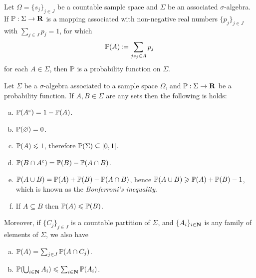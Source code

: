 \begin{lemma}
\label{lem:probability-function}
Let \(\Omega = \{s_j\}_{j \in J}\) be a countable sample space and \(\Sigma\) be
an associated \(\sigma\)-algebra. If \(\operatorname{\mathbb{P}}: \Sigma \to \mathbf{R}\) is a mapping
associated with non-negative real numbers \(\{p_j\}_{j \in J}\) with
\(\sum_{j \in J} p_j = 1\), for which
\[
\operatorname{\mathbb{P}}(A) \coloneq \sum_{j \relax s_j \in A} p_j
\]
for each \(A \in \Sigma\), then \(\operatorname{\mathbb{P}}\) is a probability function on \(\Sigma\).
\end{lemma}

\begin{theorem}
\label{thm:probability-calculus-basics}
Let \(\Sigma\) be a \(\sigma\)-algebra associated to a sample space \(\Omega\),
and \(\operatorname{\mathbb{P}}: \Sigma \to \mathbf{R}\) be a probability function. If \(A, B \in \Sigma\) are
any sets then the following is holds:
\begin{enumerate}[(a)]\setlength\itemsep{0em}
\item \(\operatorname{\mathbb{P}}({A}^{\text{c}}) = 1 - \operatorname{\mathbb{P}}(A)\).
\item \(\operatorname{\mathbb{P}}(\varnothing) = 0\).
\item \(\operatorname{\mathbb{P}}(A) \leqslant 1\), therefore \(\operatorname{\mathbb{P}}(\Sigma) \subseteq [0, 1]\).
\item \(\operatorname{\mathbb{P}}(B \cap {A}^{\text{c}}) = \operatorname{\mathbb{P}}(B) - \operatorname{\mathbb{P}}(A \cap B)\).
\item \(\operatorname{\mathbb{P}}(A \cup B) = \operatorname{\mathbb{P}}(A) + \operatorname{\mathbb{P}}(B) - \operatorname{\mathbb{P}}(A \cap B)\), hence
  \(\operatorname{\mathbb{P}}(A \cup B) \geqslant \operatorname{\mathbb{P}}(A) + \operatorname{\mathbb{P}}(B) - 1\), which is known as the
  \emph{Bonferroni's inequality}.
\item If \(A \subseteq B\) then \(\operatorname{\mathbb{P}}(A) \leqslant \operatorname{\mathbb{P}}(B)\).
\end{enumerate}
Moreover, if \(\{C_{j}\}_{j \in J}\) is a countable partition of \(\Sigma\), and
\(\{A_i\}_{i \in \mathbf{N}}\) is any family of elements of \(\Sigma\), we also have
\begin{enumerate}[(a)]\setlength\itemsep{0em}\setcounter{enumi}{6}
\item \(\operatorname{\mathbb{P}}(A) = \sum_{j \in J} \operatorname{\mathbb{P}}(A \cap C_j)\).
\item \(\operatorname{\mathbb{P}}(\bigcup_{i \in \mathbf{N}} A_i) \leqslant \sum_{i \in \mathbf{N}} \operatorname{\mathbb{P}}(A_i)\).
\end{enumerate}
\end{theorem}

